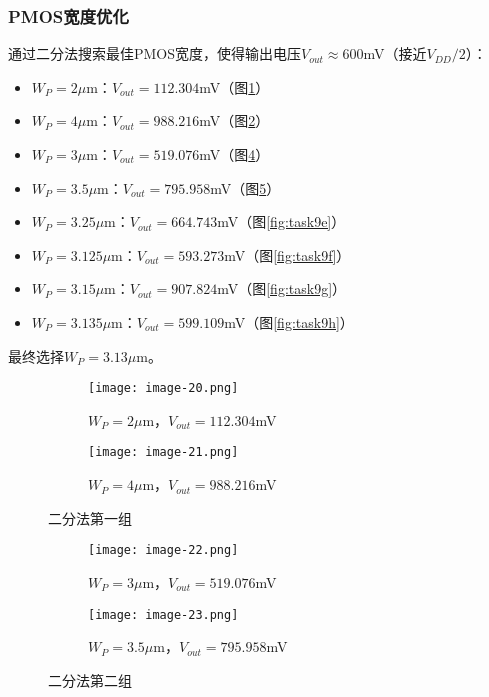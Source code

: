 \documentclass[UTF8,12pt,a4paper]{ctexart}
\begin{document}
\subsubsection{PMOS宽度优化}
通过二分法搜索最佳PMOS宽度，使得输出电压$V_{out} \approx 600$mV（接近$V_{DD}/2$）：

\begin{itemize}
\item $W_P = 2\mu$m：$V_{out} = 112.304$mV（图\ref{fig:task9a}）
\item $W_P = 4\mu$m：$V_{out} = 988.216$mV（图\ref{fig:task9b}）
\item $W_P = 3\mu$m：$V_{out} = 519.076$mV（图\ref{fig:task9c}）
\item $W_P = 3.5\mu$m：$V_{out} = 795.958$mV（图\ref{fig:task9d}）
\item $W_P = 3.25\mu$m：$V_{out} = 664.743$mV（图\ref{fig:task9e}）
\item $W_P = 3.125\mu$m：$V_{out} = 593.273$mV（图\ref{fig:task9f}）
\item $W_P = 3.15\mu$m：$V_{out} = 907.824$mV（图\ref{fig:task9g}）
\item $W_P = 3.135\mu$m：$V_{out} = 599.109$mV（图\ref{fig:task9h}）
\end{itemize}

最终选择$W_P = 3.13\mu$m。

\begin{figure}[htbp]
    \centering
    \begin{subfigure}[b]{0.45\textwidth} %
        \centering
        \texttt{[image: image-20.png]} 
        \caption{$W_P = 2\mu$m，$V_{out} = 112.304$mV}
        \label{fig:task9a}
    \end{subfigure}
    \hfill %
    \begin{subfigure}[b]{0.45\textwidth}
        \centering
        \texttt{[image: image-21.png]} 
        \caption{$W_P = 4\mu$m，$V_{out} = 988.216$mV}
        \label{fig:task9b}
    \end{subfigure}
    \label{fig:task9ab}
    \caption{二分法第一组}
\end{figure}

\begin{figure}[htbp]
    \centering
    \begin{subfigure}[b]{0.45\textwidth} %
        \centering
        \texttt{[image: image-22.png]} 
        \caption{$W_P = 3\mu$m，$V_{out} = 519.076$mV}
        \label{fig:task9c}
    \end{subfigure}
    \hfill %
    \begin{subfigure}[b]{0.45\textwidth}
        \centering
        \texttt{[image: image-23.png]} 
        \caption{$W_P = 3.5\mu$m，$V_{out} = 795.958$mV}
        \label{fig:task9d}
    \end{subfigure}
    \label{fig:task9cd}
    \caption{二分法第二组}
\end{figure}
\end{document}

